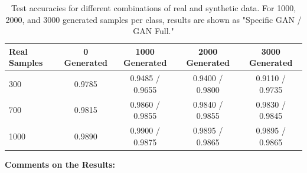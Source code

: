 \documentclass[12pt]{article}
\begin{document}
\begin{table}[h]
\centering
\caption{Test accuracies for different combinations of real and synthetic data. For 1000, 2000, and 3000 generated samples per class, results are shown as "Specific GAN / GAN Full."}
\label{tab:results}
\begin{tabular}{|l|c|c|c|c|}
\hline
\textbf{Real Samples} & \textbf{0 Generated} & \textbf{1000 Generated} & \textbf{2000 Generated} & \textbf{3000 Generated} \\
\hline
300 & 0.9785 & 0.9485 / 0.9655 & 0.9400 / 0.9800 & 0.9110 / 0.9735 \\
\hline
700 & 0.9815 & 0.9860 / 0.9855 & 0.9840 / 0.9855 & 0.9830 / 0.9845 \\
\hline
1000 & 0.9890 & 0.9900 / 0.9875 & 0.9895 / 0.9865 & 0.9895 / 0.9865 \\
\hline
\end{tabular}
\end{table}

\textbf{Comments on the Results:}
\end{document}
